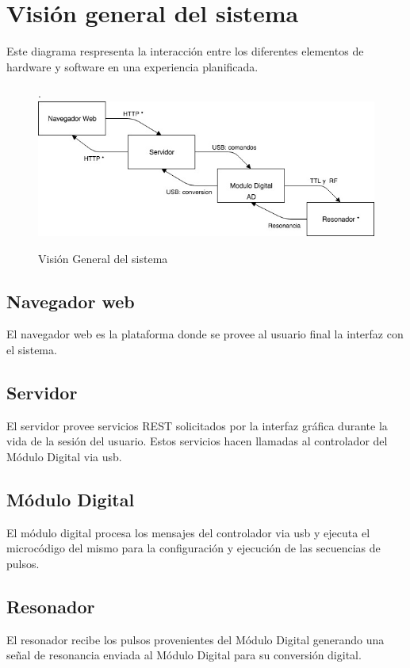 \section{Visi\'on general del sistema}

Este diagrama respresenta la interacci\'on entre los diferentes elementos de hardware 
y software en una experiencia planificada.

\begin{figure}[!htb].
    \includegraphics[width=\linewidth]{../figures/d5.jpg}
    \caption{Visi\'on General del sistema}
    \label{fig:d5}
\end{figure}

\subsection{Navegador web}
El navegador web es la plataforma donde se provee al usuario final la interfaz con el sistema.

\subsection{Servidor}
El servidor provee servicios REST solicitados por la interfaz gr\'afica durante la vida
de la sesi\'on del usuario. Estos servicios hacen llamadas al controlador del M\'odulo
Digital via usb.

\subsection{M\'odulo Digital}
El m\'odulo digital procesa los mensajes del controlador via usb y ejecuta 
el microc\'odigo del mismo para la configuraci\'on y ejecuci\'on de las secuencias de pulsos.

\subsection{Resonador}
El resonador recibe los pulsos provenientes del M\'odulo Digital generando una se\~nal de resonancia
enviada al M\'odulo Digital para su conversi\'on digital.

\newpage
